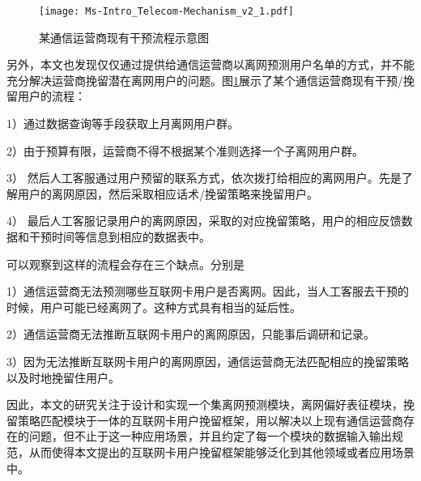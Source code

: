 
\begin{figure}[hbt]
	\centering
	\texttt{[image: Ms-Intro\_Telecom-Mechanism\_v2\_1.pdf]}
	\caption{某通信运营商现有干预流程示意图}
	\label{Fig:Telecom-Mechanism}
\end{figure}

另外，本文也发现仅仅通过提供给通信运营商以离网预测用户名单的方式，并不能充分解决运营商挽留潜在离网用户的问题。图\ref{Fig:Telecom-Mechanism}展示了某个通信运营商现有干预/挽留用户的流程：\par
	1）通过数据查询等手段获取上月离网用户群。\par
	2）由于预算有限，运营商不得不根据某个准则选择一个子离网用户群。\par
	3） 然后人工客服通过用户预留的联系方式，依次拨打给相应的离网用户。先是了解用户的离网原因，然后采取相应话术/挽留策略来挽留用户。\par
	4） 最后人工客服记录用户的离网原因，采取的对应挽留策略，用户的相应反馈数据和干预时间等信息到相应的数据表中。
\par
可以观察到这样的流程会存在三个缺点。分别是\par
	1）通信运营商无法预测哪些互联网卡用户是否离网。因此，当人工客服去干预的时候，用户可能已经离网了。这种方式具有相当的延后性。\par
	2）通信运营商无法推断互联网卡用户的离网原因，只能事后调研和记录。\par
	3）因为无法推断互联网卡用户的离网原因，通信运营商无法匹配相应的挽留策略以及时地挽留住用户。
\par
因此，本文的研究关注于设计和实现一个集离网预测模块，离网偏好表征模块，挽留策略匹配模块于一体的互联网卡用户挽留框架，用以解决以上现有通信运营商存在的问题，但不止于这一种应用场景，并且约定了每一个模块的数据输入输出规范，从而使得本文提出的互联网卡用户挽留框架能够泛化到其他领域或者应用场景中。\par

